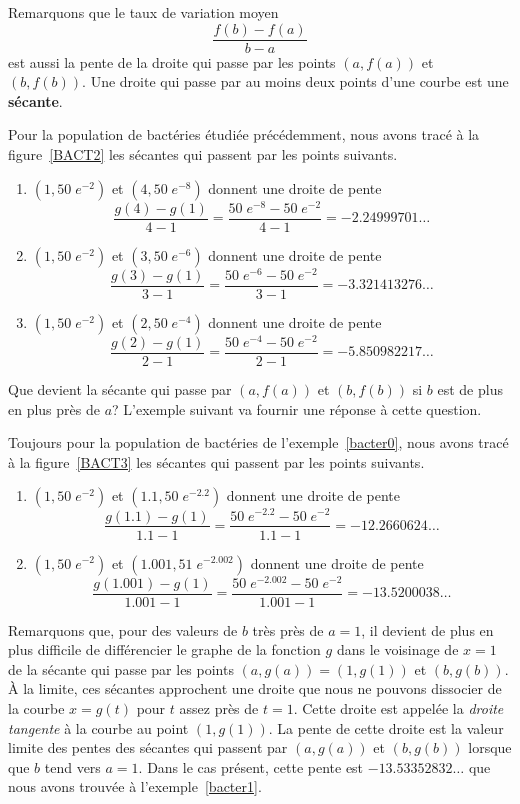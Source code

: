 {Remarquons que le taux de variation moyen
\[
\frac{f(b)-f(a)}{b-a}
\]
est aussi la pente de la droite qui passe par les points $(a,f(a))$ et
$(b,f(b))$.  Une droite qui passe par au moins deux points d'une
courbe est une {\bfseries sécante}. 

\begin{egg}
Pour la population de bactéries étudiée précédemment, nous avons tracé à la
figure~\ref{BACT2} les sécantes qui passent par les points suivants.
\begin{enumerate}
\item $(1,50 \; e^{-2})$ et $(4,50 \; e^{-8})$
donnent une droite de pente
\[
\frac{g(4)-g(1)}{4-1} = \frac{50 \; e^{-8}- 50 \; e^{-2}}
{4-1} = -2.24999701\ldots
\]
\item $(1,50 \; e^{-2})$ et $(3,50 \; e^{-6})$
donnent une droite de pente
\[
\frac{g(3)-g(1)}{3-1} = \frac{50 \; e^{-6}- 50 \; e^{-2}}
{3-1} = -3.321413276\ldots
\]
\item $(1,50 \; e^{-2})$ et $(2,50 \; e^{-4})$
donnent une droite de pente
\[
\frac{g(2)-g(1)}{2-1} = \frac{50 \; e^{-4}- 50 \; e^{-2}}
{2-1} = -5.850982217\ldots
\]
\end{enumerate}
\end{egg}


Que devient la sécante qui passe par $(a,f(a))$ et $(b,f(b))$ si $b$
est de plus en plus près de $a$?  L'exemple suivant va fournir une
réponse à cette question.

\begin{egg}
Toujours pour la population de bactéries de l'exemple~\ref{bacter0},
nous avons tracé à la figure~\ref{BACT3} les sécantes qui passent par les
points suivants.
\begin{enumerate}
\item $(1,50 \; e^{-2})$ et $(1.1,50 \; e^{-2.2})$
donnent une droite de pente
\[
\frac{g(1.1)-g(1)}{1.1-1} =
\frac{50 \; e^{-2.2}- 50 \; e^{-2}}{1.1-1}
= -12.2660624\ldots
\]
\item $(1,50\; e^{-2})$ et $(1.001,51 \; e^{-2.002})$
donnent une droite de pente
\[
\frac{g(1.001)-g(1)}{1.001-1} =
\frac{50 \; e^{-2.002}- 50 \; e^{-2}}{1.001-1}
= -13.5200038\ldots
\]
\end{enumerate}
Remarquons que, pour des valeurs de $b$ très près de $a=1$, il
devient de plus en plus difficile de différencier le graphe de la
fonction $g$ dans le voisinage de $x=1$ de la sécante qui passe par
les points $(a,g(a))=(1,g(1))$ et $(b,g(b))$.  À la limite, ces
sécantes approchent une droite que nous ne pouvons dissocier de la
courbe $x=g(t)$ pour $t$ assez près de $t=1$.  Cette droite est
appelée la {\em droite tangente} à la courbe au point $(1,g(1))$.  La
pente de cette droite est la valeur limite des pentes des sécantes qui
passent par $(a,g(a))$ et $(b,g(b))$ lorsque que $b$ tend vers $a=1$.
Dans le cas présent, cette pente est $-13.53352832\ldots$ que nous
avons trouvée à l'exemple~\ref{bacter1}.
\end{egg}

}
